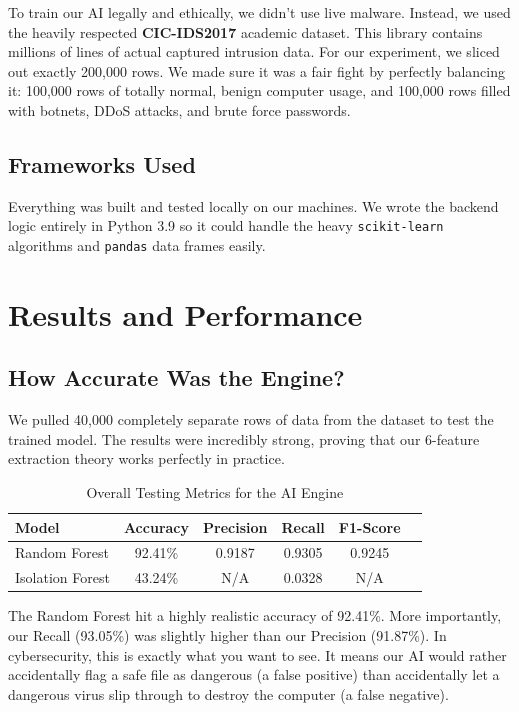 \documentclass[conference]{IEEEtran}
\begin{document}
To train our AI legally and ethically, we didn't use live malware. Instead, we used the heavily respected \textbf{CIC-IDS2017} academic dataset. This library contains millions of lines of actual captured intrusion data. For our experiment, we sliced out exactly 200,000 rows. We made sure it was a fair fight by perfectly balancing it: 100,000 rows of totally normal, benign computer usage, and 100,000 rows filled with botnets, DDoS attacks, and brute force passwords. 

\subsection{Frameworks Used}

Everything was built and tested locally on our machines. We wrote the backend logic entirely in Python 3.9 so it could handle the heavy \texttt{scikit-learn} algorithms and \texttt{pandas} data frames easily. 

\section{Results and Performance}

\subsection{How Accurate Was the Engine?}

We pulled 40,000 completely separate rows of data from the dataset to test the trained model. The results were incredibly strong, proving that our 6-feature extraction theory works perfectly in practice.

\begin{table}[htbp]
\centering
\caption{Overall Testing Metrics for the AI Engine}
\begin{tabular}{lccccc}
\toprule
\textbf{Model} & \textbf{Accuracy} & \textbf{Precision} & \textbf{Recall} & \textbf{F1-Score} \\
\midrule
Random Forest & 92.41\% & 0.9187 & 0.9305 & 0.9245 \\
Isolation Forest & 43.24\% & N/A & 0.0328 & N/A \\
\bottomrule
\end{tabular}
\label{tab:results}
\end{table}

The Random Forest hit a highly realistic accuracy of 92.41\%. More importantly, our Recall (93.05\%) was slightly higher than our Precision (91.87\%). In cybersecurity, this is exactly what you want to see. It means our AI would rather accidentally flag a safe file as dangerous (a false positive) than accidentally let a dangerous virus slip through to destroy the computer (a false negative).
\end{document}
